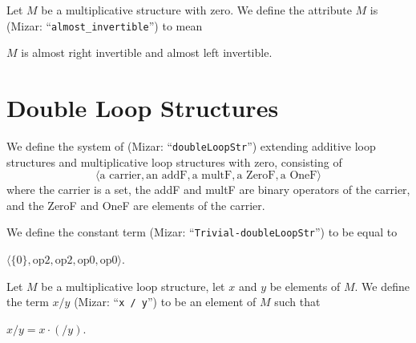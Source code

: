 \documentclass{article}
\begin{document}
\begin{definition}
Let $M$ be a multiplicative structure with zero.
We define the attribute $M$ is 
(Mizar: ``\verb#almost_invertible#'')
to mean
\begin{defn}
\item $M$ is almost right invertible and almost left invertible.
\end{defn}
\end{definition}

\section{Double Loop Structures}

\begin{definition}
We define the system of 
(Mizar: ``\verb#doubleLoopStr#'') extending additive loop structures and
multiplicative loop structures with zero, consisting of
\[\langle\mbox{a carrier}, \mbox{an addF}, \mbox{a multF}, \mbox{a ZeroF}, \mbox{a OneF}\rangle\]
where the carrier is a set, the addF and multF are binary operators of
the carrier, and the ZeroF and OneF are elements of the carrier.
\end{definition}

\begin{definition}
We define the constant term  (Mizar: ``\verb#Trivial-doubleLoopStr#'')
to be equal to
\begin{defn}%
\item $\langle\{0\},\mbox{op2},\mbox{op2},\mbox{op0},\mbox{op0}\rangle$.
\end{defn}
\end{definition}

\begin{definition}
Let $M$ be a multiplicative loop structure, let $x$ and $y$ be elements
of $M$.
We define the term $x/y$
(Mizar: ``\verb#x / y#'')
 to be an element of $M$ such that
\begin{defn}%
\item $x/y = x\cdot(/y)$.
\end{defn}
\end{definition}
\end{document}
